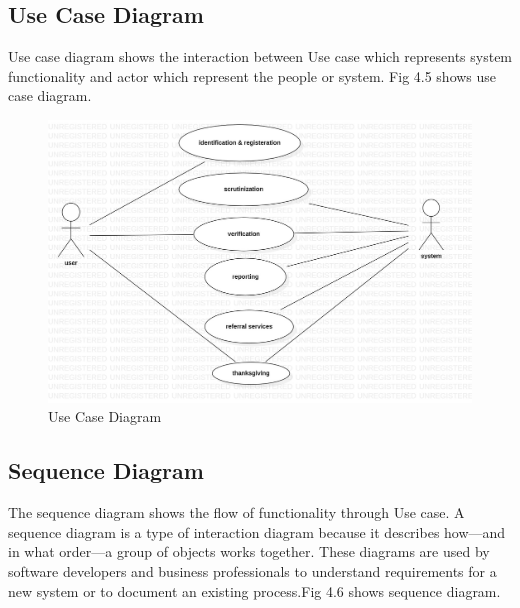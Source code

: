 \subsection{Use Case Diagram}
Use case diagram shows the interaction between Use case which represents system functionality and actor which represent the people or system. Fig 4.5 shows use case diagram.
\begin{figure}[H]
    \centering
    \includegraphics[scale=0.35]{design/usecase.jpg}
    \caption{Use Case Diagram}
    \label{fig:my_label}
\end{figure}


\subsection{Sequence Diagram}

The sequence diagram shows the flow of functionality through Use case. A sequence diagram is a type of interaction diagram because it describes how—and in what order—a group of objects works together. These diagrams are used by software developers and business professionals to understand requirements for a new system or to document an existing process.Fig 4.6 shows sequence diagram.

